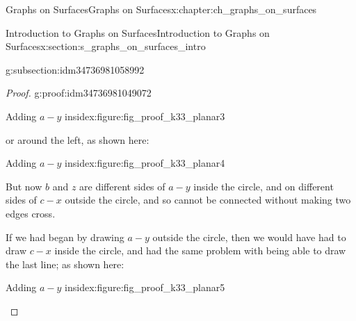 \documentclass[oneside,10pt,]{book}
\numberwithin{equation}{section}
\begin{document}
\begin{chapterptx}{Graphs on Surfaces}{}{Graphs on Surfaces}{}{}{x:chapter:ch_graphs_on_surfaces}
\begin{sectionptx}{Introduction to Graphs on Surfaces}{}{Introduction to Graphs on Surfaces}{}{}{x:section:s_graphs_on_surfaces_intro}
\begin{subsectionptx}{}{}{}{}{}{g:subsection:idm34736981058992}
\begin{proof}{}{g:proof:idm34736981049072}
\begin{figureptx}{Adding \(a-y\) inside}{x:figure:fig_proof_k33_planar3}{}
\begin{image}{0.15}{0.7}{0.15}
{
}%
\end{image}%
\tcblower
\end{figureptx}%
or around the left, as shown here:%
\begin{figureptx}{Adding \(a-y\) inside}{x:figure:fig_proof_k33_planar4}{}%
\begin{image}{0.15}{0.7}{0.15}%
%
\end{image}%
\tcblower
\end{figureptx}%
But now \(b\) and \(z\) are different sides of \(a-y\) inside the circle, and on different sides of \(c-x\) outside the circle, and so cannot be connected without making two edges cross.%
\par
If we had began by drawing \(a-y\) outside the circle, then we would have had to draw \(c-x\) inside the circle, and had the same problem with being able to draw the last line; as shown here:%
\begin{figureptx}{Adding \(a-y\) inside}{x:figure:fig_proof_k33_planar5}{}%
\begin{image}{0.15}{0.7}{0.15}%
\end{image}
\end{figureptx}
\end{proof}
\end{subsectionptx}
\end{sectionptx}
\end{chapterptx}
\end{document}

